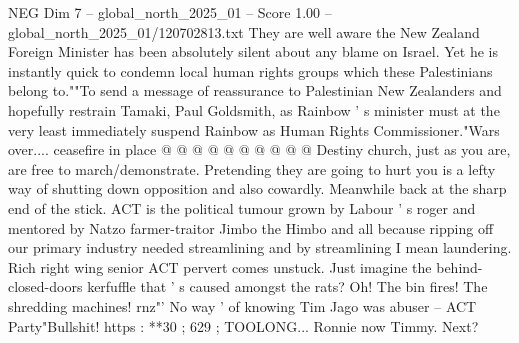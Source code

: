 \begin{textsample}{NEG Dim 7 – global\_north\_2025\_01 – Score 1.00 – global\_north\_2025\_01/120702813.txt}
They are well aware the New Zealand Foreign Minister has been absolutely silent about any blame on Israel.
Yet he is instantly quick to condemn local human rights groups which these Palestinians belong to.""To send a message of reassurance to Palestinian New Zealanders and hopefully restrain Tamaki, Paul Goldsmith, as Rainbow ' s minister must at the very least immediately suspend Rainbow as Human Rights Commissioner."Wars over.... ceasefire in place @ @ @ @ @ @ @ @ @ @ Destiny church, just as you are, are free to march/demonstrate.
Pretending they are going to hurt you is a lefty way of shutting down opposition and also cowardly.
Meanwhile back at the sharp end of the stick.
ACT is the political tumour grown by Labour ' s roger and mentored by Natzo farmer-traitor Jimbo the Himbo and all because ripping off our primary industry needed streamlining and by streamlining I mean laundering.
Rich right wing senior ACT pervert comes unstuck.
Just imagine the behind-closed-doors kerfuffle that ' s caused amongst the rats?
Oh!
The bin fires!
The shredding machines! rnz"' No way ' of knowing Tim Jago was abuser -- ACT Party"Bullshit! https : **30 ; 629 ; TOOLONG...
Ronnie now Timmy.
Next?

\end{textsample}
